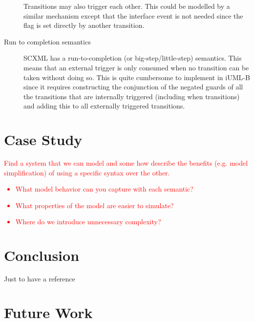 \documentclass{easychair}
\begin{document}
\begin{description}
Transitions may also trigger each other. This could be 
modelled by a similar mechanism except that the interface 
event is not needed since the flag is set directly by 
another transition.

\item [Run to completion semantics] SCXML has a run-to-completion (or big-step/little-step) semantics. This means that an external trigger is only consumed when no transition can be taken without doing so. This is quite cumbersome to implement in iUML-B since it requires constructing the conjunction of the negated guards of all the transitions that are internally triggered (including when transitions) and adding this to all externally triggered transitions.

\end{description}







\section{Case Study}
\label{sect:caseS}

\textcolor{red}{Find a system that we can model and some how describe the benefits 
(e.g. model simplification) of using a specific syntax over the other.
	\begin{itemize}
		\item What model behavior can you capture with each semantic?
		\item What properties of the model are easier to simulate?
		\item Where do we introduce unnecessary complexity?
	\end{itemize}	
}

\section{Conclusion}
\label{sect:concl}

Just to have a reference ~\cite{texniccenter}

\section{Future Work}
\label{sect:future-work}
\end{document}
